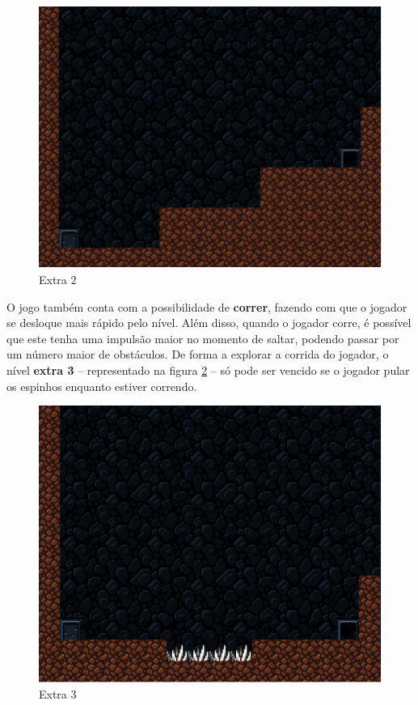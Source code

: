 \begin{figure}[H]
\centering
\includegraphics[width=\textwidth / 2]{fig/levels/extra2.pdf}
\caption{Extra 2}
\label{fig:extra2}
\end{figure}

O jogo também conta com a possibilidade de \textbf{correr}, fazendo com que o
jogador se desloque mais rápido pelo nível. Além disso, quando o jogador corre,
é possível que este tenha uma impulsão maior no momento de saltar, podendo
passar por um número maior de obstáculos. De forma a explorar a corrida do
jogador, o nível \textbf{extra 3} -- representado na figura \ref{fig:extra3} --
só pode ser vencido se o jogador pular os espinhos enquanto estiver correndo.

\begin{figure}[H]
\centering
\includegraphics[width=\textwidth / 2]{fig/levels/extra3.pdf}
\caption{Extra 3}
\label{fig:extra3}
\end{figure}

